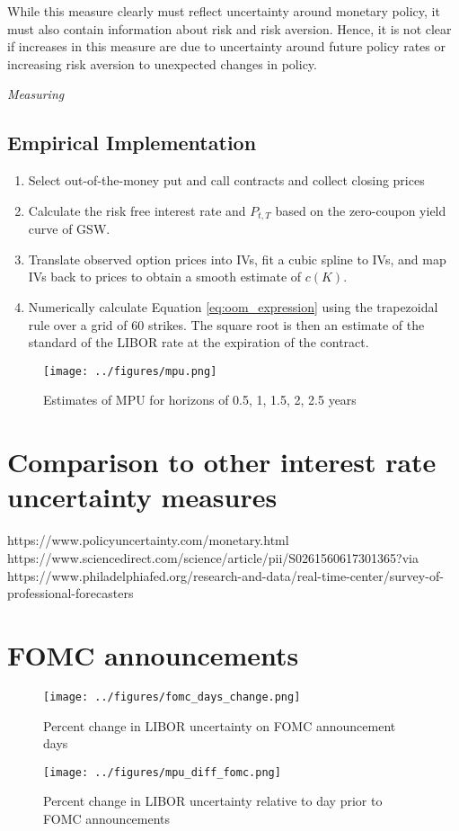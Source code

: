 \documentclass[11pt]{article}
\begin{document}
While this measure clearly must reflect uncertainty around monetary policy, it must also contain information about risk and risk aversion. Hence, it is not clear if increases in this measure are due to uncertainty around future policy rates or increasing risk aversion to unexpected changes in policy. 

\textit{Measuring }
\subsection{Empirical Implementation}
\begin{enumerate}
	\item Select out-of-the-money put and call contracts and collect closing prices
	\item Calculate the risk free interest rate and $P_{t, T}$ based on the zero-coupon yield curve of GSW. 
	\item Translate observed option prices into IVs, fit a cubic spline to IVs, and map IVs back to prices to obtain a smooth estimate of $c(K)$.
	\item Numerically calculate Equation \ref{eq:oom_expression} using the trapezoidal rule over a grid of 60 strikes. The square root is then an estimate of the standard of the LIBOR rate at the expiration of the contract.
\end{enumerate}
\begin{figure}
	\centering
	\texttt{[image: ../figures/mpu.png]}
	\caption{Estimates of MPU for horizons of 0.5, 1, 1.5, 2, 2.5 years}
	\label{fig:mpu}
\end{figure}
\section{Comparison to other interest rate uncertainty measures}\label{results}
https://www.policyuncertainty.com/monetary.html\\
https://www.sciencedirect.com/science/article/pii/S0261560617301365?via%
https://www.philadelphiafed.org/research-and-data/real-time-center/survey-of-professional-forecasters
\section{FOMC announcements}
\begin{figure}
	\centering
	\texttt{[image: ../figures/fomc\_days\_change.png]}
	\caption{Percent change in LIBOR uncertainty on FOMC announcement days}
	\label{fig:fomc_days}
\end{figure}
\begin{figure}
	\centering
	\texttt{[image: ../figures/mpu\_diff\_fomc.png]}
	\caption{Percent change in LIBOR uncertainty relative to day prior to FOMC announcements}
	\label{fig:fomc_cycle_chg}
\end{figure}
\end{document}
